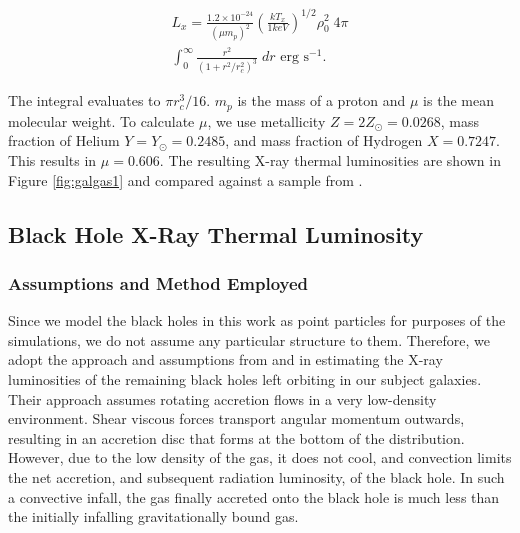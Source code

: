 \documentclass[fleqn,usenatbib,useAMS]{mnras}
\begin{document}
\begin{equation}
\begin{aligned}
    L_x ={} \frac{1.2 \times 10^{-24}}{(\mu m_p)^2}\left(\frac{kT_x}{1keV}\right)^{1/2}\rho_0^{2}\;4{\pi} \\
    \int_{0}^{\infty}\frac{r^2}{(1+r^2/r_c^2)^{3}}\;dr\text{  erg s}^{-1}.
\end{aligned}
\end{equation}

The integral evaluates to ${\pi}r_c^3/16$.  $m_p$ is the mass of a proton and $\mu$ is the mean molecular weight.  To calculate $\mu$, we use metallicity $Z=2Z_{\odot}=0.0268$, mass fraction of Helium $Y=Y_{\odot}=0.2485$, and mass fraction of Hydrogen $X=0.7247$.  This results in $\mu=0.606$. The resulting X-ray thermal luminosities are shown in Figure \ref{fig:galgas1} and compared against a sample from \citet{2018ApJ...857...32B}.

\subsection{Black Hole X-Ray Thermal Luminosity}
\subsubsection{Assumptions and Method Employed}
Since we model the black holes in this work as point particles for purposes of the simulations, we do not assume any particular structure to them.  Therefore, we adopt the approach and assumptions from \citealt{2018MNRAS.476.1412I} and \citealt{2019MNRAS.486.5377I} in estimating the X-ray luminosities of the remaining black holes left orbiting in our subject galaxies.  Their approach assumes rotating accretion flows in a very low-density environment.  Shear viscous forces transport angular momentum outwards, resulting in an accretion disc that forms at the bottom of the distribution.  However, due to the low density of the gas, it does not cool, and convection limits the net accretion, and subsequent radiation luminosity, of the black hole.  In such a convective infall, the gas finally accreted onto the black hole is much less than the initially infalling gravitationally bound gas.
\end{document}
